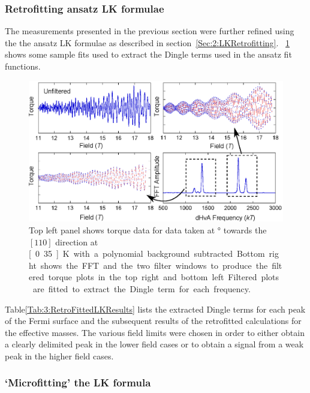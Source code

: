\subsubsection{Retrofitting ansatz LK formulae}

The measurements presented in the previous section were further refined using the the ansatz LK formulae as described in section~\ref{Sec:2:LKRetrofitting}. \Fig~\ref{Fig:3:DingleTermExtractionFits} shows some sample fits used to extract the Dingle terms used in the ansatz fit functions.
\begin{figure}[htbp]
    \begin{center}
        \includegraphics[scale=0.9]{Chapter3-dHvABaFe2P2/Figures/Mass/FittingDingleTerm/FittingDingleTerm}
        \caption{Top left panel shows torque data for data taken at \unit[12]{\degree} towards the $[110]$ direction at \unit[0.35]{K} with a polynomial background subtracted. Bottom right shows the FFT and the two filter windows to produce the filtered torque plots in the top right and bottom left. Filtered plots are fitted to extract the Dingle term for each frequency.}
        \label{Fig:3:DingleTermExtractionFits}
    \end{center}
\end{figure}
Table\ref{Tab:3:RetroFittedLKResults} lists the extracted Dingle terms for each peak of the Fermi surface and the subsequent results of the retrofitted calculations for the effective masses. The various field limits were chosen in order to either obtain a clearly delimited peak in the lower field cases or to obtain a signal from a weak peak in the higher field cases.


\subsubsection{`Microfitting' the LK formula}

